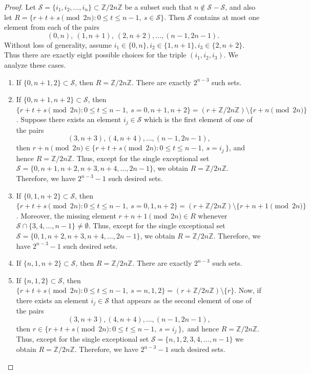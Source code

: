 \documentclass[11pt,reqno]{amsart}
\numberwithin{equation}{section}
\begin{document}
\begin{proof}
Let $\mathcal{S}=\{i_1,i_2,\ldots,i_n\}\subset  \mathbb{Z}/2n\mathbb{Z}$ be a subset such that $n\not\in \mathcal{S}-\mathcal{S}$, and also let $R=\{r+t+s\pmod{2n}:0\leq t\leq n-1,\ s\in \mathcal{S}\}$. Then $\mathcal{S}$ contains at most one element from each of the pairs 
$$(0,n),~(1,n+1),~(2,n+2),\ldots,(n-1,2n-1).$$
Without loss of generality, assume $i_1\in \{0,n\},i_2\in \{1,n+1\},i_3\in\{2,n+2\}$. Thus there are exactly eight possible choices for the triple $(i_1,i_2,i_3)$. We analyze these cases.
\begin{enumerate}
    \item If $\{0,n+1,2\}\subset\mathcal{S}$, then $R=\mathbb{Z}/2n\mathbb{Z}$. There are exactly $2^{n-3}$ such sets.
    \item If $\{0,n+1,n+2\}\subset\mathcal{S}$, then $\{r+t+s \pmod{2n}:0\leq t\leq n-1,\ s=0,n+1,n+2\}=(r+\mathbb{Z}/2n\mathbb{Z})\setminus\{r+n \pmod{2n}\}$. Suppose  there exists an element $i_j\in\mathcal{S}$ which  is the first element of one of the pairs
$$(3,n+3),(4,n+4),\ldots,(n-1,2n-1),$$
then $r+n\pmod{2n}\in\{r+t+s \pmod{2n}: 0\leq t\leq n-1,\ s=i_j \,\}$, and hence $R=\mathbb{Z}/2n\mathbb{Z}$. Thus, except for the single exceptional set $\mathcal{S}=\{0,n+1,n+2,n+3,n+4,\ldots, 2n-1\}$, we obtain $R=\mathbb{Z}/2n\mathbb{Z}$. Therefore, we have $2^{n-3}-1$ such desired sets.


\item If $\{0,1,n+2\}\subset\mathcal{S}$, then $\{r+t+s\pmod{2n}:0\leq t\leq n-1,\ s=0,1,n+2\}=(r+\mathbb{Z}/2n\mathbb{Z})\setminus\{r+n+1\pmod{2n}\}$. Moreover, the missing element $r+n+1\pmod{2n}\in R$ whenever  $\mathcal{S}\cap \{3,4,\ldots, n-1\}\neq\emptyset$. Thus, except for the single exceptional set $\mathcal{S}=\{0,1,n+2,n+3,n+4,\ldots, 2n-1\}$, we obtain $R=\mathbb{Z}/2n\mathbb{Z}$. Therefore, we have $2^{n-3}-1$ such desired sets.


\item If $\{n,1,n+2\}\subset\mathcal{S}$, then $R=\mathbb{Z}/2n\mathbb{Z}$. There are exactly $2^{n-3}$ such sets.

\item If $\{n,1,2\}\subset\mathcal{S}$, then $\{r+t+s\pmod{2n}:0\leq t\leq n-1,\ s=n,1,2\}=(r+\mathbb{Z}/2n\mathbb{Z})\setminus\{r\}$. Now, if there exists  an element $i_j\in\mathcal{S}$ that appears as  the second element of one of the pairs
$$(3,n+3),(4,n+4),\ldots,(n-1,2n-1),$$
then $r\in\{r+t+s\pmod{2n} : 0\leq t\leq n-1,\ s=i_j \,\},$ and hence $R=\mathbb{Z}/2n\mathbb{Z}$. Thus, except for the single exceptional set $\mathcal{S}=\{n,1,2,3,4,\ldots, n-1\}$ we obtain $R=\mathbb{Z}/2n\mathbb{Z}$. Therefore, we have $2^{n-3}-1$ such desired sets.


\end{enumerate}
\end{proof}
\end{document}
